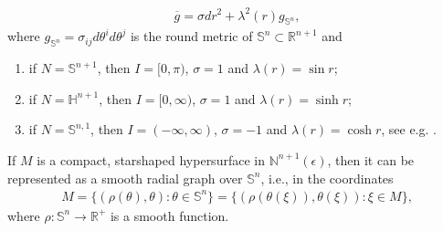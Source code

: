 \documentclass[11pt,reqno]{amsart}
\theoremstyle{definition}
\theoremstyle{remark}
\numberwithin{equation}{section}
\renewcommand{\(}{\left(}
\renewcommand{\)}{\right)}
\renewcommand{\~}{\tilde}
\renewcommand{\-}{\overline}
\newcommand{\e}{\epsilon}
\renewcommand{\l}{\lambda}
\renewcommand{\t}{\theta}
\newcommand{\s}{\sigma}
\newcommand{\ra}{\rightarrow}
\begin{document}
\begin{align}\label{s2:warped-metric}
\-g=\s dr^2+\l^2(r)g_{\mathbb S^n},
\end{align}
where $g_{\mathbb S^n}=\s_{ij}d\t^id\t^j$ is the round metric of $\mathbb S^n\subset \mathbb R^{n+1}$ and
\begin{enumerate}
	\item if $N=\mathbb S^{n+1}$, then $I=[0,\pi)$, $\s=1$ and $\l(r)=\sin r$;
	\item if $N=\mathbb H^{n+1}$, then $I=[0,\infty)$, $\s=1$ and $\l(r)=\sinh r$;
	\item if $N=\mathbb S^{n,1}$, then $I=(-\infty,\infty)$, $\s=-1$ and $\l(r)=\cosh r$, see e.g. \cite[Lemma 2.1]{Scheuer19}.
\end{enumerate}

If $M$ is a compact, starshaped hypersurface in $\mathbb N^{n+1}(\e)$, then it can be represented as a smooth radial graph over $\mathbb S^n$, i.e., in the coordinates
\begin{align}\label{s2:radial-graph}
M=\{(\rho(\t),\t): \t \in\mathbb S^n\}=\{(\rho(\t(\xi)),\t(\xi)):\xi\in M\},
\end{align}
where $\rho:\mathbb S^n \ra \mathbb R^{+}$ is a smooth function. 
\end{document}
